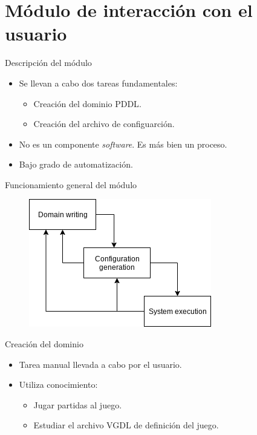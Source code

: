 \documentclass[11pt]{beamer}    %
\begin{document}
    \section{Módulo de interacción con el usuario}

    \begin{frame}{Descripción del módulo}

        \begin{itemize}
            \item Se llevan a cabo dos tareas fundamentales:
                \begin{itemize}
                    \item Creación del \alert{dominio PDDL}.
                    \item Creación del \alert{archivo de configuarción}.
                \end{itemize}
            \item No es un componente \textit{software}. Es más bien un \alert{proceso}.
            \item Bajo grado de automatización.
        \end{itemize}
    \end{frame}

    \begin{frame}{Funcionamiento general del módulo}
        \begin{figure}
            \centering
            \includegraphics[scale=0.5]{img/presentation/cascade_model}
        \end{figure}
    \end{frame}
    
    \begin{frame}{Creación del dominio}
        \begin{itemize}
            \item Tarea manual llevada a cabo por el usuario.
            \item Utiliza conocimiento:
            \begin{itemize}
                \item Jugar partidas al juego.
                \item Estudiar el archivo VGDL de definición del juego.
            \end{itemize}
        \end{itemize}
    \end{frame}
    
\end{document}
